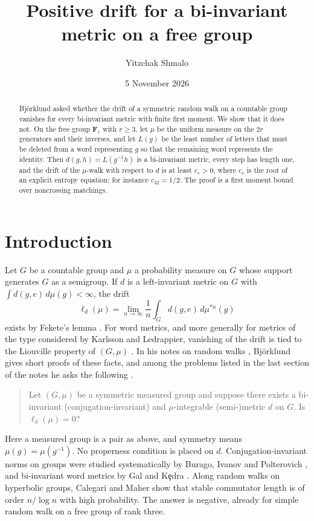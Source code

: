 \documentclass[11pt]{amsart}
\title{Positive drift for a bi-invariant metric on a free group}
\author{Yitzchak Shmalo}
\date{5 November 2026}
\theoremstyle{definition}
\theoremstyle{remark}
\numberwithin{equation}{section}
\newcommand{\F}{\mathbf F}
\begin{document}
\begin{abstract}
Bj\"orklund asked whether the drift of a symmetric random walk on a countable group vanishes for every bi-invariant metric with finite first moment. We show that it does not. On the free group $\F_r$ with $r\ge3$, let $\mu$ be the uniform measure on the $2r$ generators and their inverses, and let $L(g)$ be the least number of letters that must be deleted from a word representing $g$ so that the remaining word represents the identity. Then $d(g,h)=L(g^{-1}h)$ is a bi-invariant metric, every step has length one, and the drift of the $\mu$-walk with respect to $d$ is at least $c_r>0$, where $c_r$ is the root of an explicit entropy equation; for instance $c_{32}=1/2$. The proof is a first moment bound over noncrossing matchings.
\end{abstract}
\maketitle

\section{Introduction}

Let $G$ be a countable group and $\mu$ a probability measure on $G$ whose support generates $G$ as a semigroup. If $d$ is a left-invariant metric on $G$ with $\int d(g,e)\,d\mu(g)<\infty$, the drift
\[
\ell_d(\mu)=\lim_{n\to\infty}\frac1n\int_G d(g,e)\,d\mu^{*n}(g)
\]
exists by Fekete's lemma \cite{F}. For word metrics, and more generally for metrics of the type considered by Karlsson and Ledrappier, vanishing of the drift is tied to the Liouville property of $(G,\mu)$ \cite{KV,KL}. In his notes on random walks \cite{B}, Bj\"orklund gives short proofs of these facts, and among the problems listed in the last section of the notes he asks the following \cite[Problem~4]{B}.

\begin{quote}
Let $(G,\mu)$ be a symmetric measured group and suppose there exists a bi-invariant (conjugation-invariant) and $\mu$-integrable (semi-)metric $d$ on $G$. Is $\ell_d(\mu)=0$?
\end{quote}

Here a measured group is a pair as above, and symmetry means $\mu(g)=\mu(g^{-1})$. No properness condition is placed on $d$. Conjugation-invariant norms on groups were studied systematically by Burago, Ivanov and Polterovich \cite{BIP}, and bi-invariant word metrics by Gal and K\c{e}dra \cite{GK}. Along random walks on hyperbolic groups, Calegari and Maher \cite{CM} show that stable commutator length is of order $n/\log n$ with high probability. The answer is negative, already for simple random walk on a free group of rank three.
\end{document}
